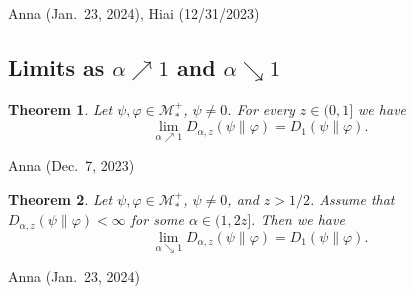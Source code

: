\documentclass[12pt]{article}
\newtheorem{theorem}{Theorem}[section]
\theoremstyle{definition}
\theoremstyle{remark}
\numberwithin{equation}{section}
\def\Me{\mathcal M}
\def\ffi{\varphi}
\begin{document}
{\color{magenta}Anna (Jan.\ 23, 2024), Hiai (12/31/2023)}

\subsection{Limits as $\alpha\nearrow1$ and $\alpha\searrow1$}

\begin{theorem}
Let $\psi,\ffi\in\Me_*^+$, $\psi\ne0$. For every $z\in(0,1]$ we have
\[
\lim_{\alpha\nearrow1}D_{\alpha,z}(\psi\|\ffi)=D_1(\psi\|\ffi).
\]
\end{theorem}
{\color{magenta}Anna (Dec.\ 7, 2023)}

\begin{theorem}
Let $\psi,\ffi\in\Me_*^+$, $\psi\ne0$, and $z>1/2$. Assume that $D_{\alpha,z}(\psi\|\ffi)<\infty$ for some
$\alpha\in(1,2z]$. Then we have
\[
\lim_{\alpha\searrow1}D_{\alpha,z}(\psi\|\ffi)=D_1(\psi\|\ffi).
\]
\end{theorem}
{\color{magenta}Anna (Jan.\ 23, 2024)}
\end{document}
